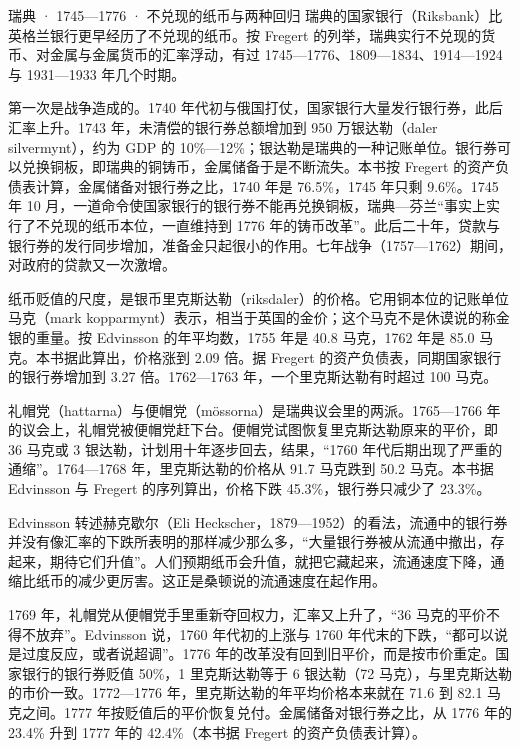 \begin{case}{瑞典 · 1745—1776 · 不兑现的纸币与两种回归}
瑞典的国家银行（Riksbank）比英格兰银行更早经历了不兑现的纸币。按 Fregert 的列举，瑞典实行不兑现的货币、对金属与金属货币的汇率浮动，有过 1745—1776、1809—1834、1914—1924 与 1931—1933 年几个时期\cite{fregert2014}。

第一次是战争造成的。1740 年代初与俄国打仗，国家银行大量发行银行券，此后汇率上升\cite{edvinsson2010}。1743 年，未清偿的银行券总额增加到 950 万银达勒（daler silvermynt），约为 GDP 的 10\%—12\%\cite{edvinsson2010}；银达勒是瑞典的一种记账单位。银行券可以兑换铜板，即瑞典的铜铸币，金属储备于是不断流失。本书按 Fregert 的资产负债表计算，金属储备对银行券之比，1740 年是 76.5\%，1745 年只剩 9.6\%\cite{fregert2014}。1745 年 10 月，一道命令使国家银行的银行券不能再兑换铜板，瑞典—芬兰“事实上实行了不兑现的纸币本位，一直维持到 1776 年的铸币改革”\cite{edvinsson2010}。此后二十年，贷款与银行券的发行同步增加，准备金只起很小的作用\cite{fregert2014}。七年战争（1757—1762）期间，对政府的贷款又一次激增\cite{fregert2014}。

纸币贬值的尺度，是银币里克斯达勒（riksdaler）的价格。它用铜本位的记账单位马克（mark kopparmynt）表示，相当于英国的金价；这个马克不是休谟说的称金银的重量。按 Edvinsson 的年平均数，1755 年是 40.8 马克，1762 年是 85.0 马克\cite{edvinsson2010,riksbank2026}。本书据此算出，价格涨到 2.09 倍。据 Fregert 的资产负债表，同期国家银行的银行券增加到 3.27 倍\cite{fregert2014}。1762—1763 年，一个里克斯达勒有时超过 100 马克\cite{edvinsson2010}。

礼帽党（hattarna）与便帽党（mössorna）是瑞典议会里的两派。1765—1766 年的议会上，礼帽党被便帽党赶下台。便帽党试图恢复里克斯达勒原来的平价，即 36 马克或 3 银达勒，计划用十年逐步回去，结果，“1760 年代后期出现了严重的通缩”\cite{edvinsson2010}。1764—1768 年，里克斯达勒的价格从 91.7 马克跌到 50.2 马克\cite{edvinsson2010,riksbank2026}。本书据 Edvinsson 与 Fregert 的序列算出，价格下跌 45.3\%，银行券只减少了 23.3\%\cite{edvinsson2010,fregert2014}。

Edvinsson 转述赫克歇尔（Eli Heckscher，1879—1952）的看法，流通中的银行券并没有像汇率的下跌所表明的那样减少那么多，“大量银行券被从流通中撤出，存起来，期待它们升值”\cite{edvinsson2010}。人们预期纸币会升值，就把它藏起来，流通速度下降，通缩比纸币的减少更厉害。这正是桑顿说的流通速度在起作用。

1769 年，礼帽党从便帽党手里重新夺回权力，汇率又上升了，“36 马克的平价不得不放弃”。Edvinsson 说，1760 年代初的上涨与 1760 年代末的下跌，“都可以说是过度反应，或者说超调”\cite{edvinsson2010}。1776 年的改革没有回到旧平价，而是按市价重定。国家银行的银行券贬值 50\%，1 里克斯达勒等于 6 银达勒（72 马克），与里克斯达勒的市价一致\cite{edvinsson2010}。1772—1776 年，里克斯达勒的年平均价格本来就在 71.6 到 82.1 马克之间\cite{edvinsson2010,riksbank2026}。1777 年按贬值后的平价恢复兑付\cite{fregert2014}。金属储备对银行券之比，从 1776 年的 23.4\% 升到 1777 年的 42.4\%（本书据 Fregert 的资产负债表计算）。


\end{case}
